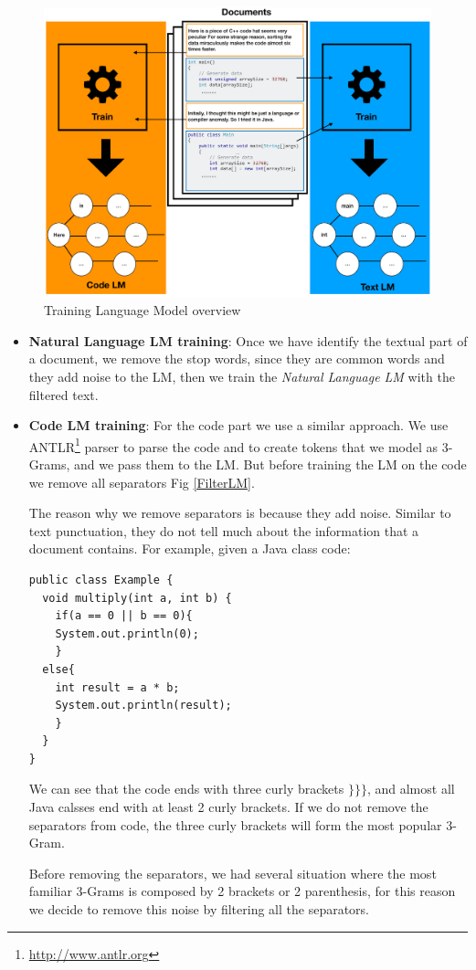 \documentclass[12pt,mscthesis]{usiinfthesis}
\begin{document}
	\begin{figure}[H]
	\centering
	\includegraphics[width=\textwidth]{trainingLm}
	\caption{Training Language Model overview}
	\label{trainingLm}
	\end{figure}


	\begin{itemize}
		\item \textbf{Natural Language LM training}: Once we have identify the textual part of a document, we remove the stop words, since they are common words and they add noise to the LM, then we train the \emph{Natural Language LM} with the filtered text.
		\item \textbf{Code LM training}: For the code part we use a similar approach. We use ANTLR\footnote{\url{http://www.antlr.org}} parser to parse the code and to create tokens that we model as 3-Grams, and we pass them to the LM. But before training the LM on the code we remove all separators Fig \ref{FilterLM}.


		The reason why we remove separators is because they add noise. Similar to text punctuation, they do not tell much about the information that a document contains. For example, given a Java class code:	

\begin{lstlisting}
public class Example {
  void multiply(int a, int b) {
    if(a == 0 || b == 0){
    System.out.println(0);   		
    }
  else{
    int result = a * b;
    System.out.println(result);
    }
  }
}

		\end{lstlisting}

		We can see that the code ends with three curly brackets $\textbf{\}\}\}}$, and almost all Java calsses end with at least 2 curly brackets. If we do not remove the separators from code, the three curly brackets will form the most popular 3-Gram.

		Before removing the separators, we had several situation where the most familiar 3-Grams is composed by 2 brackets or 2 parenthesis, for this reason we decide to remove this noise by filtering all the separators.

	\end{itemize}
	
\end{document}
